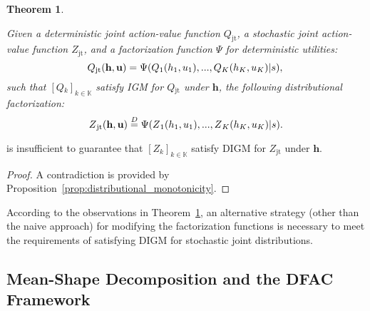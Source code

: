 \documentclass[twoside,11pt]{article}
\newcommand{\state}{s}
\newcommand{\jointaction}{\mathbf{u}}
\newcommand{\action}{u}
\newcommand{\jointobservationhistory}{\mathbf{h}}
\newcommand{\observationhistory}{h}
\newcommand{\agentspace}{\mathbb{K}}
\newcommand{\agentcounter}{k}
\newcommand{\numberofagents}{K}
\newcommand{\utilityexp}{Q}
\newcommand{\utility}{Z}
\newcommand{\joint}{\mathrm{jt}}
\newcommand{\meandecompositionfunction}{\Psi}
\newcommand{\digm}{DIGM}
\newcommand{\eqd}{\overset{D}{=}}
\newcounter{theorem0}
\newtheorem{theorem}[theorem0]{Theorem}
\begin{document}
\begin{theorem}
\label{thm:distributional_igm}

Given a deterministic joint action-value function $\utilityexp_{\joint}$, a stochastic joint action-value function $\utility_{\joint}$, and a factorization function $\meandecompositionfunction$ for deterministic utilities:
\begin{equation}
\utilityexp{}_{\joint{}}(\jointobservationhistory{},{\jointaction{}})=\meandecompositionfunction(\utilityexp{}_1(\observationhistory{}_1,\action{}_1), ..., \utilityexp{}_{\numberofagents{}}(\observationhistory{}_{\numberofagents{}},\action{}_{\numberofagents{}})\vert\state),
\notag{}
\end{equation}
such that $[\utilityexp{}_\agentcounter{}]_{\agentcounter{}\in\agentspace{}}$ satisfy IGM for $\utilityexp{}_{\joint{}}$ under $\jointobservationhistory{}$, the following distributional factorization:
\begin{equation}
\utility{}_{\joint{}}(\jointobservationhistory{},{\jointaction{}})\eqd\meandecompositionfunction(\utility{}_1(\observationhistory{}_1,\action{}_1), ..., \utility{}_{\numberofagents{}}(\observationhistory{}_{\numberofagents{}},\action{}_{\numberofagents{}})\vert\state).
\notag{}
\end{equation}
\end{theorem}
is insufficient to guarantee that $[\utility{}_\agentcounter{}]_{\agentcounter{}\in\agentspace{}}$ satisfy \digm{} for $\utility{}_{\joint{}}$ under $\jointobservationhistory{}$.

\begin{proof}
A contradiction is provided by Proposition~\ref{prop:distributional_monotonicity}.
\end{proof} According to the observations in Theorem~\ref{thm:distributional_igm}, an alternative strategy (other than the naive approach) for modifying the factorization functions is necessary to meet the requirements of satisfying \digm{} for stochastic joint distributions.



\subsection{Mean-Shape Decomposition and the DFAC Framework}
\label{subsec:methodology_the_proposed_dfac_framework}
\end{document}
